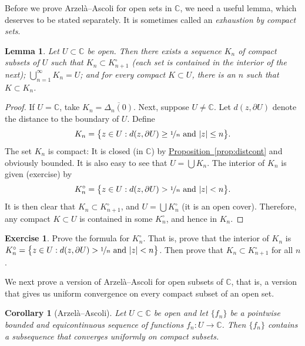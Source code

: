 \documentclass[12pt,openany]{book}
\newcommand{\sabs}[1]{\lvert {#1} \rvert}
\newcommand{\C}{{\mathbb{C}}}
\newcommand{\myindex}[1]{#1\index{#1}}
\theoremstyle{plain}
\newtheorem{lemma}[thm]{Lemma}
\newtheorem{cor}[thm]{Corollary}
\theoremstyle{remark}
\theoremstyle{definition}
\newenvironment{exbox}{%
    \def\FrameCommand{\vrule width 1pt \relax\hspace{10pt}}%
    \MakeFramed{\advance\hsize-\width\FrameRestore}%
}{%
    \endMakeFramed
}
\theoremstyle{exercise}
\newtheorem{exercise}{Exercise}[section]
\theoremstyle{example}
\newcommand{\propref}[1]{\hyperref[#1]{Proposition~\ref*{#1}}}
\begin{document}
Before we prove 
Arzel\`a--Ascoli for open sets in $\C$, we need a useful
lemma, which deserves to be stated separately.
It is sometimes called an \emph{\myindex{exhaustion by compact sets}}.

\begin{lemma}\label{lemma:compactexhaustion}
Let $U \subset \C$ be open.  Then there exists a sequence $K_n$
of compact subsets of $U$ such that $K_n \subset K^\circ_{n+1}$ (each set
is contained in the interior of the next); $\bigcup_{n=1}^\infty K_n = U$; and
for every compact $K \subset U$, there is an $n$ such that $K \subset K_n$.
\end{lemma}

\begin{proof}
If $U=\C$, take $K_n = \overline{\Delta_n(0)}$.  Next, suppose $U \neq \C$.
Let $d(z,\partial U)$ denote the distance to the boundary of $U$.  Define
\begin{equation*}
K_n = \bigl\{
z \in U : d(z,\partial U) \geq \nicefrac{1}{n} \text{ and } \sabs{z} \leq
n
\bigr\} .
\end{equation*}
The set $K_n$ is compact: It is closed (in $\C$) by
\propref{prop:distcont} and obviously bounded.
It is also easy to see that $U = \bigcup K_n$.  The interior
of $K_n$ is given (exercise) by
\begin{equation*}
K^\circ_n =
\bigl\{
z \in U : d(z,\partial U) > \nicefrac{1}{n} \text{ and } \sabs{z} < n
\bigr\} .
\end{equation*}
It is then clear that $K_n \subset K^\circ_{n+1}$, and
$U = \bigcup K^\circ_n$ (it is an open cover).
Therefore, any compact $K \subset U$
is contained in some $K^\circ_n$, and hence in $K_n$.
\end{proof}

\begin{exbox}
\begin{exercise}
Prove the formula for $K^\circ_n$.  That is, prove that the interior
of $K_n$ is
$K^\circ_n = \bigl\{
z \in U : d(z,\partial U) > \nicefrac{1}{n} \text{ and } \sabs{z} < n
\bigr\}$.  Then prove that $K_n \subset K^\circ_{n+1}$ for all $n$.
\end{exercise}
\end{exbox}

We next prove a version of Arzel\`a--Ascoli for open subsets of $\C$,
that is,
a version that gives us uniform convergence
on every compact subset of an open set.

\begin{cor}[Arzel\`a--Ascoli]
\label{cor:arzelaascoliplane}
Let $U \subset \C$ be open and let $\{ f_n \}$
be a pointwise bounded and equicontinuous sequence
of functions $f_n \colon U \to \C$.  Then
$\{ f_n \}$ contains a subsequence
that converges uniformly on compact subsets.
\end{cor}
\end{document}
